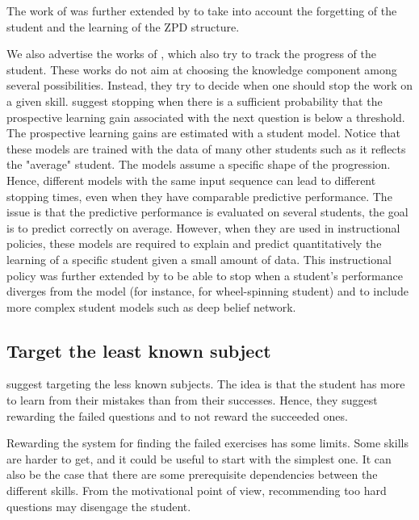 The work of \citet{clement2015multi} was further extended by \citet{mu2018combining} to take into account the forgetting of the student and the learning of the ZPD structure. 

We also advertise the works of \citet{rollinson2015predictive, kaser2016stop}, which also try to track the progress of the student. These works do not aim at choosing the knowledge component among several possibilities. Instead, they try to decide when one should stop the work on a given skill. \citet{rollinson2015predictive} suggest stopping when there is a sufficient probability that the prospective learning gain associated with the next question is below a threshold. The prospective learning gains are estimated with a student model. Notice that these models are trained with the data of many other students such as it reflects the "average" student.  The models assume a specific shape of the progression. Hence, different models with the same input sequence can lead to different stopping times, even when they have comparable predictive performance. The issue is that the predictive performance is evaluated on several students, the goal is to predict correctly on average. However, when they are used in instructional policies, these models are required to explain and predict quantitatively the learning of a specific student given a small amount of data. This instructional policy was further extended by \citet{kaser2016stop} to be able to stop when a student's performance diverges from the model (for instance, for wheel-spinning student) and to include more complex student models such as deep belief network. 

\subsection{Target the least known subject}
\label{ss:less-known}
\citet{melesko2019computer} suggest targeting the less known subjects. The idea is that the student has more to learn from their mistakes than from their successes. Hence, they suggest rewarding the failed questions and to not reward the succeeded ones. 

Rewarding the system for finding the failed exercises has some limits. Some skills are harder to get, and it could be useful to start with the simplest one. It can also be the case that there are some prerequisite dependencies between the different skills. From the motivational point of view, recommending too hard questions may disengage the student. 

